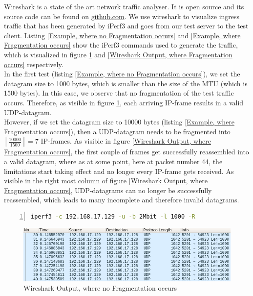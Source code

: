 Wireshark is a state of the art network traffic analyser. It is open source and its source code can be found on \href{https://github.com/wireshark/wireshark}{github.com}\cite{combs2019wireshark}. We use wireshark to visualize ingress traffic that has been generated by iPerf3 and goes from our test server to the test client. Listing \ref{Example, where no Fragmentation occurs} and \ref{Example, where Fragmentation occurs} show the iPerf3 commands used to generate the traffic, which is visualized in figure \ref{Wireshark Output, where no Fragmentation occurs} and \ref{Wireshark Output, where Fragmentation occurs} respectively.
\\
In the first test (listing \ref{Example, where no Fragmentation occurs}), we set the datagram size to 1000 bytes, which is smaller than the size of the \acs{MTU} (which is 1500 bytes). In this case, we observe that no fragmentation of the test traffic occurs. Therefore, as visible in figure \ref{Wireshark Output, where no Fragmentation occurs}, each arriving \acs{IP}-frame results in a valid \acs{UDP}-datagram.
\\
However, if we set the datagram size to 10000 bytes (listing \ref{Example, where Fragmentation occurs}), then a \acs{UDP}-datagram needs to be fragmented into $\left\lceil\frac{10000}{1500}\right\rceil = 7$ \acs{IP}-frames. As visible in figure \ref{Wireshark Output, where Fragmentation occurs}, the first couple of frames get successfully reassembled into a valid datagram, where as at some point, here at packet number 44, the limitations start taking effect and no longer every \acs{IP}-frame gets received. As visible in the right most column of figure \ref{Wireshark Output, where Fragmentation occurs}, \acs{UDP}-datagrams can no longer be successfully reassembled, which leads to many incomplete and therefore invalid datagrams.

\newpage

\begin{lstlisting}[language=sh, caption = {Example, where no Fragmentation occurs}, captionpos=b, numbers=left, frame=single, breaklines=true, breakatwhitespace=true, showstringspaces=false, label={Example, where no Fragmentation occurs}]
iperf3 -c 192.168.17.129 -u -b 2Mbit -l 1000 -R
\end{lstlisting}

\begin{figure}[h]
	\centering
	\includegraphics[width=\textwidth]{img/wireshark_l_1000_b_2Mbit.png}
	\caption{Wireshark Output, where no Fragmentation occurs}
	\label{Wireshark Output, where no Fragmentation occurs}
\end{figure}

